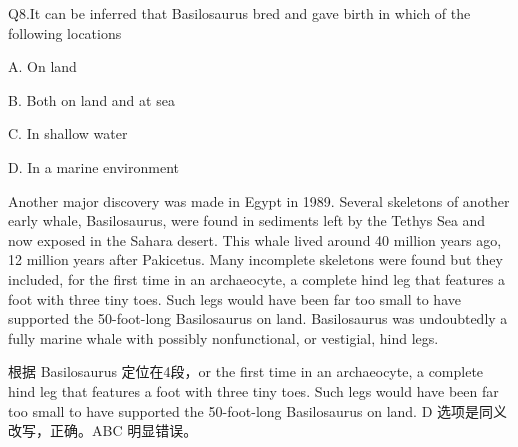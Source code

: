 \begin{blk}
    \begin{qst}
        Q8.It can be inferred that Basilosaurus bred and gave birth in which of the following locations
    \end{qst}

    \begin{chc}
        A. On land

        B. Both on land and at sea

        C. In shallow water

        D. In a marine environment
    \end{chc}

    \begin{psgq}
        Another major discovery was made in Egypt in 1989. Several skeletons of another early whale, Basilosaurus, were found in sediments left by the Tethys Sea and now exposed in the Sahara desert. This whale lived around 40 million years ago, 12 million years after Pakicetus. Many incomplete skeletons were found but they included, for the first time in an archaeocyte, a complete hind leg that features a foot with three tiny toes. Such legs would have been far too small to have supported the 50-foot-long Basilosaurus on land. Basilosaurus was undoubtedly a fully marine whale with possibly nonfunctional, or vestigial, hind legs.
    \end{psgq}

    \begin{nlz}
        根据 Basilosaurus 定位在4段，or the first time in an archaeocyte, a complete hind leg that features a foot with three tiny toes. Such legs would have been far too small to have supported the 50-foot-long Basilosaurus on land. D 选项是同义改写，正确。ABC 明显错误。
    \end{nlz}
\end{blk}
